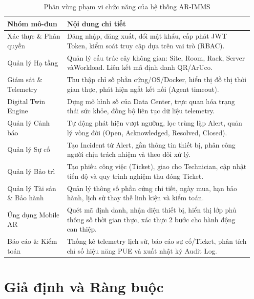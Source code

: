 \begin{table}[H]
\centering
\begin{tabularx}{\textwidth}{|l|X|}
\hline
\textbf{Nhóm mô-đun} & \textbf{Nội dung chi tiết} \\ \hline
Xác thực \& Phân quyền & Đăng nhập, đăng xuất, đổi mật khẩu, cấp phát JWT Token, kiểm soát truy cập dựa trên vai trò (RBAC). \\ \hline
Quản lý Hạ tầng & Quản lý cấu trúc cây không gian: Site, Room, Rack, Server vàWorkload. Liên kết mã định danh QR/ArUco. \\ \hline
Giám sát \& Telemetry & Thu thập chỉ số phần cứng/OS/Docker, hiển thị đồ thị thời gian thực, phát hiện ngắt kết nối (Agent timeout). \\ \hline
Digital Twin Engine & Dựng mô hình số của Data Center, trực quan hóa trạng thái sức khỏe, đồng bộ liên tục dữ liệu telemetry. \\ \hline
Quản lý Cảnh báo & Tự động phát hiện vượt ngưỡng, lọc trùng lặp Alert, quản lý vòng đời (Open, Acknowledged, Resolved, Closed). \\ \hline
Quản lý Sự cố & Tạo Incident từ Alert, gắn thông tin thiết bị, phân công người chịu trách nhiệm và theo dõi xử lý. \\ \hline
Quản lý Bảo trì & Tạo phiếu công việc (Ticket), giao cho Technician, cập nhật tiến độ và quy trình nghiệm thu đóng Ticket. \\ \hline
Quản lý Tài sản \& Bảo hành & Quản lý thông số phần cứng chi tiết, ngày mua, hạn bảo hành, lịch sử thay thế linh kiện và kiểm toán. \\ \hline
Ứng dụng Mobile AR & Quét mã định danh, nhận diện thiết bị, hiển thị lớp phủ thông số thời gian thực, xác thực 2 bước cho hành động can thiệp. \\ \hline
Báo cáo \& Kiểm toán & Thống kê telemetry lịch sử, báo cáo sự cố/Ticket, phân tích chỉ số hiệu năng PUE và xuất nhật ký Audit Log. \\ \hline
\end{tabularx}
\caption{Phân vùng phạm vi chức năng của hệ thống AR-IMMS}
\end{table}

\section{Giả định và Ràng buộc}

